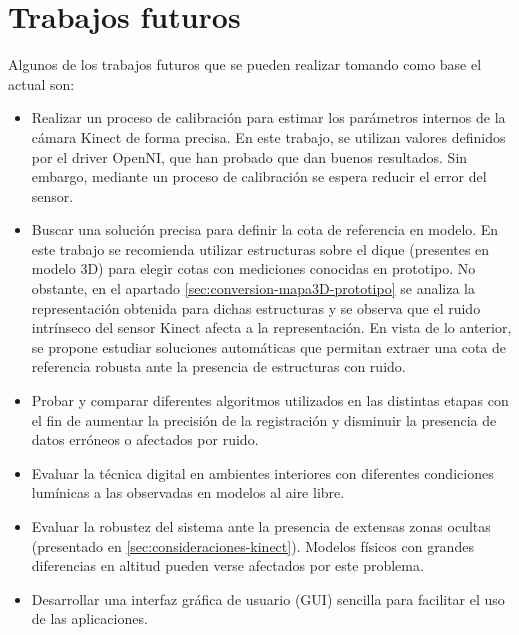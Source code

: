 \chapter{Trabajos futuros}

Algunos de los trabajos futuros que se pueden realizar tomando como base el actual son:

\begin{itemize}

\item Realizar un proceso de calibración para estimar los parámetros internos \cite{wiki-calibracion-camara} de la cámara Kinect de forma precisa. En este trabajo, se utilizan valores definidos por el driver OpenNI, que han probado que dan buenos resultados. Sin embargo, mediante un proceso de calibración se espera reducir el error del sensor.

\item Buscar una solución precisa para definir la cota de referencia en modelo. En este trabajo se recomienda utilizar estructuras sobre el dique (presentes en modelo 3D) para elegir cotas con mediciones conocidas en prototipo. No obstante, en el apartado \ref{sec:conversion-mapa3D-prototipo} se analiza la representación obtenida para dichas estructuras y se observa que el ruido intrínseco del sensor Kinect afecta a la representación. En vista de lo anterior, se propone estudiar soluciones automáticas que permitan extraer una cota de referencia robusta ante la presencia de estructuras con ruido.

\item Probar y comparar diferentes algoritmos utilizados en las distintas etapas con el fin de aumentar la precisión de la registración y disminuir la presencia de datos erróneos o afectados por ruido.

\item Evaluar la técnica digital en ambientes interiores con diferentes condiciones lumínicas a las observadas en modelos al aire libre. 

\item Evaluar la robustez del sistema ante la presencia de extensas zonas ocultas (presentado en \ref{sec:consideraciones-kinect}). Modelos físicos con grandes diferencias en altitud pueden verse afectados por este problema.

\item Desarrollar una interfaz gráfica de usuario (GUI) sencilla para facilitar el uso de las aplicaciones.

\end{itemize}